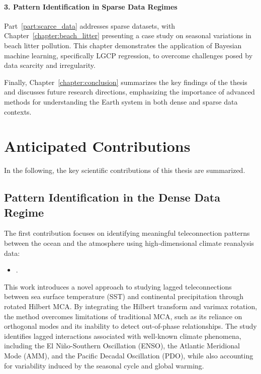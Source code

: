 \paragraph{3. Pattern Identification in Sparse Data Regimes}
Part~\ref{part:scarce_data} addresses sparse datasets, with Chapter~\ref{chapter:beach_litter} presenting a case study on seasonal variations in beach litter pollution. This chapter demonstrates the application of Bayesian machine learning, specifically LGCP regression, to overcome challenges posed by data scarcity and irregularity.

Finally, Chapter~\ref{chapter:conclusion} summarizes the key findings of the thesis and discusses future research directions, emphasizing the importance of advanced methods for understanding the Earth system in both dense and sparse data contexts.

\section*{Anticipated Contributions}

In the following, the key scientific contributions of this thesis are summarized.

\subsection*{Pattern Identification in the Dense Data Regime}

The first contribution focuses on identifying meaningful teleconnection patterns between the ocean and the atmosphere using high-dimensional climate reanalysis data:

\begin{itemize}
    \item {}.
\end{itemize}

This work introduces a novel approach to studying lagged teleconnections between sea surface temperature (SST) and continental precipitation through rotated Hilbert MCA. By integrating the Hilbert transform and varimax rotation, the method overcomes limitations of traditional MCA, such as its reliance on orthogonal modes and its inability to detect out-of-phase relationships. The study identifies lagged interactions associated with well-known climate phenomena, including the El Niño-Southern Oscillation (ENSO), the Atlantic Meridional Mode (AMM), and the Pacific Decadal Oscillation (PDO), while also accounting for variability induced by the seasonal cycle and global warming.

